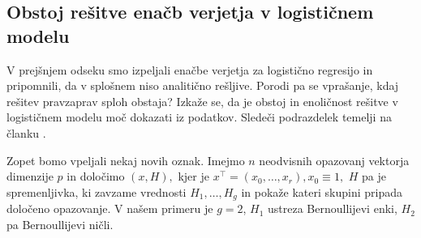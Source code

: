 \documentclass[12pt,a4paper]{amsart}
\theoremstyle{definition} %
\theoremstyle{plain} %
\begin{document}
\subsection{Obstoj rešitve enačb verjetja v logističnem modelu}

V prejšnjem odseku smo izpeljali enačbe verjetja za logistično regresijo in pripomnili, da v splošnem niso analitično rešljive. Porodi pa se vprašanje,
kdaj rešitev pravzaprav sploh obstaja? Izkaže se, da je obstoj in enoličnost rešitve v logističnem modelu moč dokazati iz podatkov. Sledeči podrazdelek temelji na članku
\cite{albert1984existence}.

Zopet bomo vpeljali nekaj novih oznak. Imejmo $n$ neodvisnih opazovanj vektorja dimenzije $p$ in določimo $(x,H),$ kjer je $x^\top = (x_{0},\ldots,x_{r}),x_{0}\equiv 1,$
$H$ pa je spremenljivka, ki zavzame vrednosti $H_{1},\ldots,H_{g}$ in pokaže kateri skupini pripada določeno opazovanje. V našem primeru je $g=2$, $H_{1}$ ustreza Bernoullijevi
enki, $H_{2}$ pa Bernoullijevi ničli.

\end{document}
